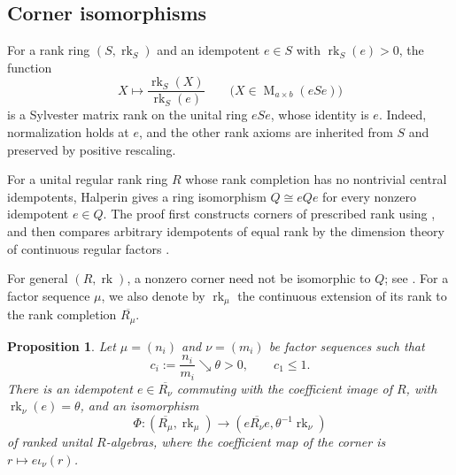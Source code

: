 \documentclass[11pt]{amsart}
\DeclareMathOperator{\rk}{rk}
\DeclareMathOperator{\Mat}{M}
\newtheorem{proposition}[theorem]{Proposition}
\theoremstyle{definition}
\theoremstyle{remark}
\begin{document}
\subsection{Corner isomorphisms}
\label{subsec:prescribed-rank-corners}

For a rank ring $(S,\rk_S)$ and an idempotent $e\in S$ with
$\rk_S(e)>0$, the function
\[
 X\longmapsto\frac{\rk_S(X)}{\rk_S(e)}
 \qquad\bigl(X\in\Mat_{a\times b}(eSe)\bigr)
\]
is a Sylvester matrix rank on the unital ring $eSe$, whose identity is $e$.
Indeed, normalization holds at $e$, and the other rank axioms are
inherited from $S$ and preserved by positive rescaling.

For a unital regular rank ring $R$ whose rank completion has no
nontrivial central idempotents,
Halperin \cite[Theorem~2]{Halperin1968} gives a ring isomorphism
$Q\cong eQe$ for every nonzero idempotent $e\in Q$.
The proof first constructs corners of prescribed rank using
\cite[Lemma~1]{Halperin1968}, and then compares arbitrary idempotents
of equal rank by the dimension theory of continuous regular factors
\cite[Lemma~4(ii)]{Halperin1968}.

For general $(R,\rk)$, a nonzero corner need not be isomorphic to $Q$;
see .
For a factor sequence $\mu$, we also denote by $\rk_\mu$ the continuous
extension of its rank to the rank completion $\overline{R_\mu}$.

\begin{proposition}\label{prop:scaled-corner-embedding}
Let $\mu=(n_i)$ and $\nu=(m_i)$ be factor sequences such that
\[
 c_i:=\frac{n_i}{m_i}\searrow\theta>0,\qquad c_1\leq1.
\]
There is an idempotent $e\in\overline{R_\nu}$ commuting with the
coefficient image of $R$, with $\rk_\nu(e)=\theta$, and an isomorphism
\[
 \Phi:(\overline{R_\mu},\rk_\mu)
 \longrightarrow(e\overline{R_\nu}e,\theta^{-1}\rk_\nu)
\]
of ranked unital $R$-algebras, where the coefficient map of the corner
is $r\mapsto e\iota_\nu(r)$.
\end{proposition}
\end{document}
